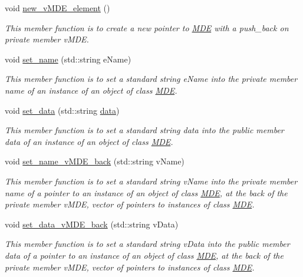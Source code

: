 \begin{DoxyCompactItemize}
void \hyperlink{classMDE_a5ab33605eb349d64b4ddb2cb234319bb}{new\+\_\+v\+M\+D\+E\+\_\+element} ()
\begin{DoxyCompactList}\small\item\em This member function is to create a new pointer to \hyperlink{classMDE}{M\+DE} with a push\+\_\+back on private member v\+M\+DE. \end{DoxyCompactList}\item 
void \hyperlink{group__group__set_ga2e3674813acead6fca16b15df8b28545}{set\+\_\+name} (std\+::string e\+Name)
\begin{DoxyCompactList}\small\item\em This member function is to set a standard string e\+Name into the private member \textquotesingle{}name\textquotesingle{} of an instance of an object of class \hyperlink{classMDE}{M\+DE}. \end{DoxyCompactList}\item 
void \hyperlink{group__group__set_gab89912ac9a4073a53e81c45221de5cc7}{set\+\_\+data} (std\+::string \hyperlink{classMDE_a4b1eec75c370b8906e7b203bfb231308}{data})
\begin{DoxyCompactList}\small\item\em This member function is to set a standard string data into the public member \textquotesingle{}data\textquotesingle{} of an instance of an object of class \hyperlink{classMDE}{M\+DE}. \end{DoxyCompactList}\item 
void \hyperlink{group__group__set_ga743b5e8fa651eaaf096211d4178a8b33}{set\+\_\+name\+\_\+v\+M\+D\+E\+\_\+back} (std\+::string v\+Name)
\begin{DoxyCompactList}\small\item\em This member function is to set a standard string v\+Name into the private member \textquotesingle{}name\textquotesingle{} of a pointer to an instance of an object of class \hyperlink{classMDE}{M\+DE}, at the back of the private member v\+M\+DE, vector of pointers to instances of class \hyperlink{classMDE}{M\+DE}. \end{DoxyCompactList}\item 
void \hyperlink{group__group__set_ga659df2c75204727d4f9d83b19f1499ac}{set\+\_\+data\+\_\+v\+M\+D\+E\+\_\+back} (std\+::string v\+Data)
\begin{DoxyCompactList}\small\item\em This member function is to set a standard string v\+Data into the public member \textquotesingle{}data\textquotesingle{} of a pointer to an instance of an object of class \hyperlink{classMDE}{M\+DE}, at the back of the private member v\+M\+DE, vector of pointers to instances of class \hyperlink{classMDE}{M\+DE}. \end{DoxyCompactList}\item 

\end{DoxyCompactItemize}
